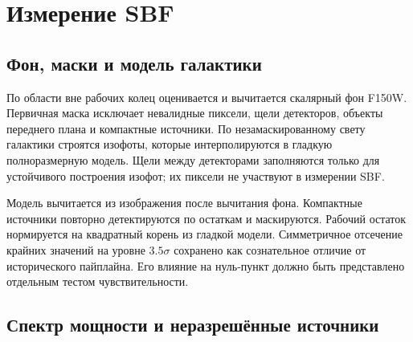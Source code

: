 \documentclass[10pt,a4paper,twocolumn]{article}
\begin{document}
\begin{table}
\centering
\caption{Параметры TRGB из Paper IV, используемые в калибровке SBF.}
\label{tab:paper4-anchor}
\end{table}

\section{Измерение SBF}

\subsection{Фон, маски и модель галактики}

По области вне рабочих колец оценивается и вычитается скалярный фон F150W.
Первичная маска исключает невалидные пиксели, щели детекторов, объекты переднего
плана и компактные источники. По незамаскированному свету галактики строятся
изофоты, которые интерполируются в гладкую полноразмерную модель. Щели между
детекторами заполняются только для устойчивого построения изофот; их пиксели
не участвуют в измерении SBF.

Модель вычитается из изображения после вычитания фона. Компактные источники
повторно детектируются по остаткам и маскируются. Рабочий остаток нормируется
на квадратный корень из гладкой модели. Симметричное отсечение крайних
значений на уровне $3.5\sigma$ сохранено как сознательное отличие от
исторического пайплайна. Его влияние на нуль-пункт должно быть представлено
отдельным тестом чувствительности.

\subsection{Спектр мощности и неразрешённые источники}
\end{document}
